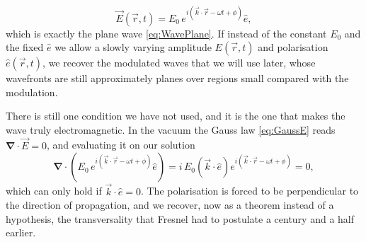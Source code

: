        \begin{equation*}
            \vec{E}(\vec{r},t) = E_0\, e^{i\left(\vec{k}\cdot\vec{r} - \omega t + \phi \right)}\hat{e},
       \end{equation*}
       which is exactly the plane wave \ref{eq:WavePlane}. If instead of the constant $E_0$ and the fixed $\hat{e}$ we allow a slowly varying amplitude $E(\vec{r},t)$ and polarisation $\hat{e}(\vec{r},t)$, we recover the modulated waves that we will use later, whose wavefronts are still approximately planes over regions small compared with the modulation.

       There is still one condition we have not used, and it is the one that makes the wave truly electromagnetic. In the vacuum the Gauss law \ref{eq:GaussE} reads $\bm{\nabla}\cdot\vec{E} = 0$, and evaluating it on our solution
       \begin{equation*}
            \bm{\nabla}\cdot\left(E_0\, e^{i\left(\vec{k}\cdot\vec{r} - \omega t + \phi\right)}\hat{e}\right) = i\, E_0\left(\vec{k}\cdot\hat{e}\right)e^{i\left(\vec{k}\cdot\vec{r} - \omega t + \phi\right)} = 0,
       \end{equation*}
       which can only hold if $\vec{k}\cdot\hat{e} = 0$. The polarisation is forced to be perpendicular to the direction of propagation, and we recover, now as a theorem instead of a hypothesis, the transversality that Fresnel had to postulate a century and a half earlier.

